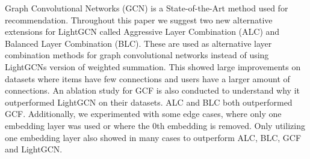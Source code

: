 Graph Convolutional Networks (GCN) is a State-of-the-Art method used for recommendation.
Throughout this paper we suggest two new alternative extensions for LightGCN called Aggressive Layer Combination (ALC) and Balanced Layer Combination (BLC).
These are used as alternative layer combination methods for graph convolutional networks instead of using LightGCNs version of weighted summation.
This showed large improvements on datasets where items have few connections and users have a larger amount of connections.
An ablation study for GCF is also conducted to understand why it outperformed LightGCN on their datasets.
ALC and BLC both outperformed GCF.
Additionally, we experimented with some edge cases, where only one embedding layer was used or where the 0th embedding is removed.
Only utilizing one embedding layer also showed in many cases to outperform ALC, BLC, GCF and LightGCN.
